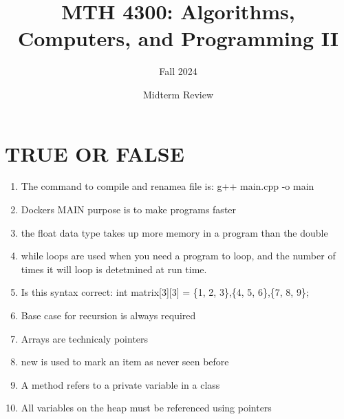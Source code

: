 \documentclass[a4paper]{article}
\title{MTH 4300: Algorithms, Computers, and Programming II}
\author{Fall 2024}
\date{Midterm Review}
\begin{document}
\maketitle


\section{TRUE OR FALSE}
\begin{enumerate}
    \item The command to compile and renamea file is: g++ main.cpp -o main
    \item Dockers MAIN purpose is to make programs faster
    \item the float data type takes up more memory in a program than the double
    \item while loops are used when you need a program to loop, 
          and the number of times it will loop is detetmined at run time.
    \item Is this syntax correct: int matrix[3][3] = \{1, 2, 3\},\{4, 5, 6\},\{7, 8, 9\};
    \item Base case for recursion is always required
    \item Arrays are technicaly pointers
    \item new is used to mark an item as never seen before
    \item A method refers to a private variable in a class
    \item All variables on the heap must be referenced using pointers
\end{enumerate}
\newpage
\end{document}
